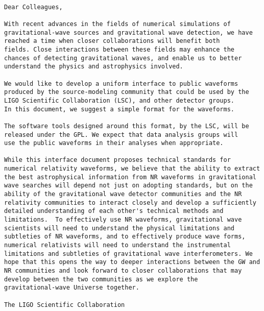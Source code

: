 \documentclass[prd,preprintnumbers,superscriptaddress,eqsecnum]{revtex4}
\numberwithin{equation}{section}
\begin{document}
\begin{verbatim}

Dear Colleagues,

With recent advances in the fields of numerical simulations of
gravitational-wave sources and gravitational wave detection, we have
reached a time when closer collaborations will benefit both
fields. Close interactions between these fields may enhance the
chances of detecting gravitational waves, and enable us to better
understand the physics and astrophysics involved.

We would like to develop a uniform interface to public waveforms
produced by the source-modeling community that could be used by the
LIGO Scientific Collaboration (LSC), and other detector groups.
In this document, we suggest a simple format for the waveforms.

The software tools designed around this format, by the LSC, will be
released under the GPL. We expect that data analysis groups will
use the public waveforms in their analyses when appropriate.

While this interface document proposes technical standards for
numerical relativity waveforms, we believe that the ability to extract
the best astrophysical information from NR waveforms in gravitational
wave searches will depend not just on adopting standards, but on the
ability of the gravitational wave detector communities and the NR
relativity communities to interact closely and develop a sufficiently
detailed understanding of each other's technical methods and
limitations.  To effectively use NR waveforms, gravitational wave
scientists will need to understand the physical limitations and
subtleties of NR waveforms, and to effectively produce wave forms,
numerical relativists will need to understand the instrumental
limitations and subtleties of gravitational wave interferometers. We
hope that this opens the way to deeper interactions between the GW and
NR communities and look forward to closer collaborations that may
develop between the two communities as we explore the
gravitational-wave Universe together. 

The LIGO Scientific Collaboration

\end{verbatim}


\newpage


\maketitle
\end{document}
